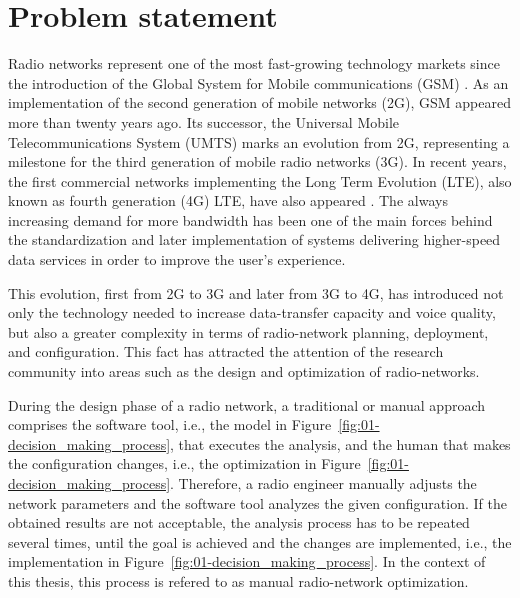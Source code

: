\section{Problem statement}

Radio networks represent one of the most fast-growing technology markets
since the introduction of the Global System for Mobile communications
(GSM)
\cite{3GPP_TR_50.099}. As an implementation of the second generation
of mobile networks (2G),
GSM appeared more than twenty years ago. Its successor, the Universal
Mobile Telecommunications System (UMTS)
\cite{3GPP_TR_23.101} marks an evolution from 2G, representing a
milestone for the third generation of mobile radio networks (3G).
In recent years, the first commercial networks implementing the Long
Term Evolution (LTE),
also known as fourth generation (4G)
LTE, have also appeared \cite{Gerstenberger-Introduction_to_LTE:2011}.
The always increasing demand for more bandwidth has been one of the
main forces behind the standardization and later implementation of
systems delivering higher-speed data services in order to improve
the user's experience.

This evolution, first from 2G to 3G and later from 3G to 4G, has introduced
not only the technology needed to increase data-transfer capacity
and voice quality, but also a greater complexity in terms of radio-network
planning, deployment, and configuration. This fact has attracted the
attention of the research community into areas such as the design
and optimization of radio-networks.

During the design phase of a radio network, a traditional or manual
approach comprises the software tool, i.e., the model in Figure~\ref{fig:01-decision_making_process},
that executes the analysis, and the human that makes the configuration
changes, i.e., the optimization in Figure~\ref{fig:01-decision_making_process}.
Therefore, a radio engineer manually adjusts the network parameters
and the software tool analyzes the given configuration. If the obtained
results are not acceptable, the analysis process has to be repeated
several times, until the goal is achieved and the changes are implemented,
i.e., the implementation in Figure~\ref{fig:01-decision_making_process}.
In the context of this thesis, this process is refered to as manual
radio-network optimization. 

